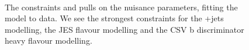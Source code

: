 \begin{figure}
\begin{centering}
\setlength{\floatsep}{5pt plus 1.0pt minus 2.0pt}
\\
\caption[The post-fit pulls]{The constraints and pulls on the nuisance parameters, fitting the model to data. We see the strongest constraints for the \ttbar+jets modelling, the JES flavour modelling and the CSV b discriminator heavy flavour modelling.}
\label{fig:tth_sldl_pulls_postfit}
\end{centering}
\end{figure}

